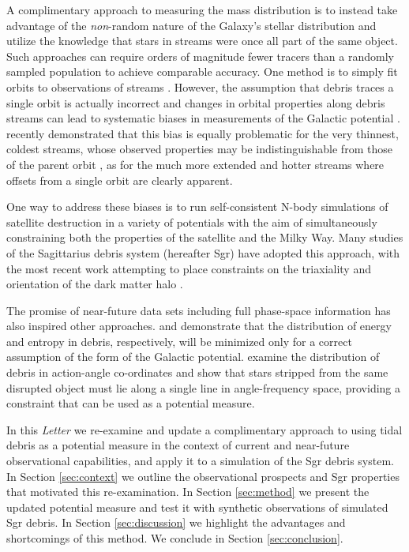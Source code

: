 A complimentary approach to measuring the mass distribution is to instead take advantage of the {\it non}-random nature of the Galaxy's stellar distribution and utilize the knowledge that stars in streams were once all part of the same object.
Such approaches can require orders of magnitude fewer tracers than a randomly sampled population to achieve comparable accuracy.
One method is to simply fit orbits to observations of streams 
\citep[e.g.,][]{koposov10}.
However, the assumption that debris traces a single orbit is actually incorrect \citep[see][]{johnston98,helmi99} and
changes in orbital properties along debris streams can lead to systematic biases in measurements of the Galactic potential \citep{eyre09a,varghese11}.
\citet{sanders13a} recently demonstrated that this bias is equally problematic for the very thinnest, coldest streams, whose observed properties may be indistinguishable from those of the parent orbit \citep[e.g. such as the globular cluster, GD1 --- see][]{koposov10}, as for the much more extended and hotter streams \citep[e.g. such as debris from the Sagittarius dwarf galaxy --- see][]{majewski03} where offsets from a single orbit are clearly apparent.

One way to address these biases is to run self-consistent N-body simulations of satellite destruction in a variety of potentials with the aim of simultaneously constraining both the properties of the satellite and the Milky Way.
Many studies of the Sagittarius debris system (hereafter Sgr) have adopted this approach,
with the most recent work attempting to place constraints on the triaxiality and orientation of the dark matter halo
\citep{law10}.

The promise of near-future data sets including full phase-space information has also inspired other approaches. \citet{binney08} and \citet{penarrubia12} demonstrate that the distribution of energy and entropy in debris, respectively, will be minimized only for a correct
assumption of the form of the Galactic potential.
\citet{sanders13b} examine the distribution of debris in action-angle co-ordinates and show that stars stripped from the same disrupted object must lie along a single line in angle-frequency space, providing a constraint that can be used as a potential measure.

In this \emph{Letter} we re-examine and update a complimentary approach to using tidal debris as a potential measure \citep[originally proposed by][]{johnston99a}  in the context of current and near-future observational capabilities, and apply it to a simulation of the Sgr debris system.
In Section \ref{sec:context} we outline the observational prospects and Sgr properties that motivated this re-examination.
In Section \ref{sec:method} we present the updated potential measure and test it with synthetic observations of simulated Sgr debris.
In Section \ref{sec:discussion} we highlight the advantages and shortcomings of this method.
We conclude in Section \ref{sec:conclusion}.

